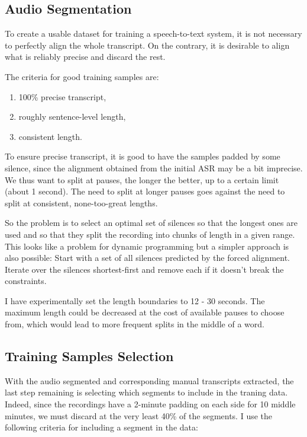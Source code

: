 \documentclass[conference]{IEEEtran}
\begin{document}
\subsection{Audio Segmentation}

To create a usable dataset for training a speech-to-text system, it is not
necessary to perfectly align the whole transcript. On the contrary, it is
desirable to align what is reliably precise and discard the rest.

The criteria for good training samples are:
\begin{enumerate}
\item{100\% precise transcript,}
\item{roughly sentence-level length,}
\item{consistent length.}
\end{enumerate}

To ensure precise transcript, it is good to have the samples padded by some
silence, since the alignment obtained from the initial ASR may be a bit
imprecise. We thus want to split at pauses, the longer the better, up to a
certain limit (about 1 second). The need to split at longer
pauses goes against the need to split at consistent, none-too-great lengths.

So the problem is to select an optimal set of silences so that the longest ones
are used and so that they split the recording into chunks of length in a given
range. This looks like a problem for dynamic programming but a simpler approach
is also possible: Start with a set of all silences predicted by the forced
alignment.  Iterate over the silences shortest-first and remove each if it
doesn't break the constraints.

I have experimentally set the length boundaries to 12 - 30 seconds. The maximum
length could be decreased at the cost of available pauses to choose from, which
would lead to more frequent splits in the middle of a word.

\subsection{Training Samples Selection}

With the audio segmented and corresponding manual transcripts extracted, the
last step remaining is selecting which segments to include in the traning data.
Indeed, since the recordings have a 2-minute padding on each side for 10 middle
minutes, we must discard at the very least 40\% of the segments. I use the
following criteria for including a segment in the data:
\end{document}
